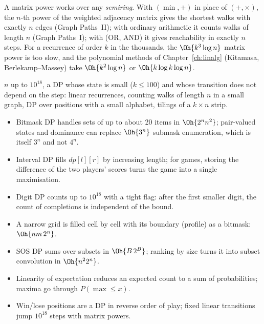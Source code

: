 
\begin{trick}
A matrix power works over any \emph{semiring}. With $(\min, +)$ in place of $(+, \times)$, the $n$-th power of the weighted adjacency
matrix gives the shortest walks with exactly $n$ edges (Graph Paths~II); with ordinary arithmetic it counts walks of length $n$
(Graph Paths~I); with (OR, AND) it gives reachability in exactly $n$ steps. For a recurrence of order $k$ in the thousands, the
$\Oh{k^3 \log n}$ matrix power is too slow, and the polynomial methods of Chapter~\ref{ch:linalg} (Kitamasa, Berlekamp--Massey) take
$\Oh{k^2 \log n}$ or $\Oh{k \log k \log n}$.
\end{trick}

\begin{recognize}
$n$ up to $10^{18}$, a DP whose state is small ($k \le 100$) and whose transition does not depend on the step: linear recurrences,
counting walks of length $n$ in a small graph, DP over positions with a small alphabet, tilings of a $k \times n$ strip.
\end{recognize}

\begin{summary}
\begin{itemize}
  \item Bitmask DP handles sets of up to about 20 items in $\Oh{2^n n^2}$; pair-valued states and dominance can replace $\Oh{3^n}$
        submask enumeration, which is itself $3^n$ and not $4^n$.
  \item Interval DP fills $dp[l][r]$ by increasing length; for games, storing the difference of the two players' scores turns the
        game into a single maximisation.
  \item Digit DP counts up to $10^{18}$ with a tight flag: after the first smaller digit, the count of completions is independent of
        the bound.
  \item A narrow grid is filled cell by cell with its boundary (profile) as a bitmask: $\Oh{nm\,2^n}$.
  \item SOS DP sums over subsets in $\Oh{B\,2^B}$; ranking by size turns it into subset convolution in $\Oh{n^2 2^n}$.
  \item Linearity of expectation reduces an expected count to a sum of probabilities; maxima go through $P(\max \le x)$.
  \item Win/lose positions are a DP in reverse order of play; fixed linear transitions jump $10^{18}$ steps with matrix powers.
\end{itemize}
\end{summary}

